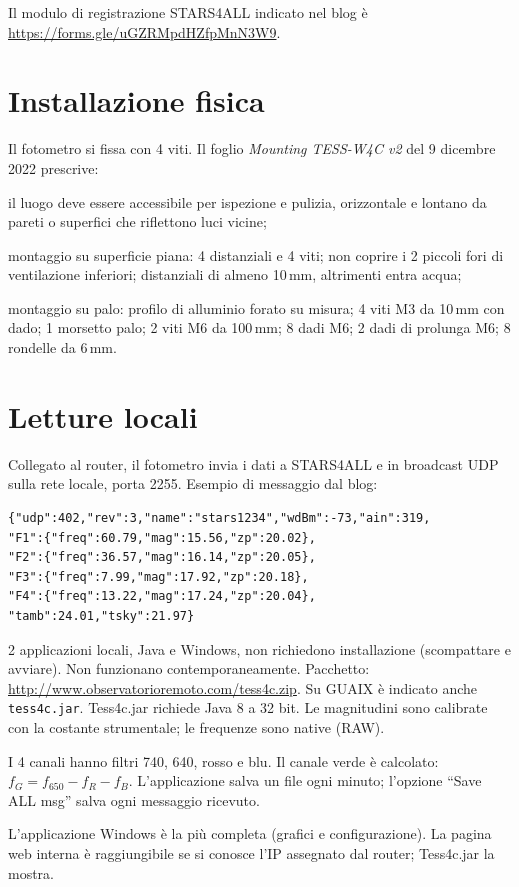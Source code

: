 \documentclass[11pt,a4paper]{report}
\begin{document}
Il modulo di registrazione STARS4ALL indicato nel blog è \url{https://forms.gle/uGZRMpdHZfpMnN3W9}.

\section{Installazione fisica}

Il fotometro si fissa con 4 viti. Il foglio \emph{Mounting TESS-W4C v2} del 9 dicembre 2022 prescrive:

il luogo deve essere accessibile per ispezione e pulizia, orizzontale e lontano da pareti o superfici che riflettono luci vicine;

montaggio su superficie piana: 4 distanziali e 4 viti; non coprire i 2 piccoli fori di ventilazione inferiori; distanziali di almeno 10\,mm, altrimenti entra acqua;

montaggio su palo: profilo di alluminio forato su misura; 4 viti M3 da 10\,mm con dado; 1 morsetto palo; 2 viti M6 da 100\,mm; 8 dadi M6; 2 dadi di prolunga M6; 8 rondelle da 6\,mm.

\section{Letture locali}

Collegato al router, il fotometro invia i dati a STARS4ALL e in broadcast UDP sulla rete locale, porta 2255. Esempio di messaggio dal blog:

\begin{lstlisting}
{"udp":402,"rev":3,"name":"stars1234","wdBm":-73,"ain":319,
"F1":{"freq":60.79,"mag":15.56,"zp":20.02},
"F2":{"freq":36.57,"mag":16.14,"zp":20.05},
"F3":{"freq":7.99,"mag":17.92,"zp":20.18},
"F4":{"freq":13.22,"mag":17.24,"zp":20.04},
"tamb":24.01,"tsky":21.97}
\end{lstlisting}

2 applicazioni locali, Java e Windows, non richiedono installazione (scompattare e avviare). Non funzionano contemporaneamente. Pacchetto: \url{http://www.observatorioremoto.com/tess4c.zip}. Su GUAIX è indicato anche \texttt{tess4c.jar}. Tess4c.jar richiede Java 8 a 32 bit. Le magnitudini sono calibrate con la costante strumentale; le frequenze sono native (RAW).

I 4 canali hanno filtri 740, 640, rosso e blu. Il canale verde è calcolato: $f_G = f_{650} - f_R - f_B$. L'applicazione salva un file ogni minuto; l'opzione ``Save ALL msg'' salva ogni messaggio ricevuto.

L'applicazione Windows è la più completa (grafici e configurazione). La pagina web interna è raggiungibile se si conosce l'IP assegnato dal router; Tess4c.jar la mostra.
\end{document}
